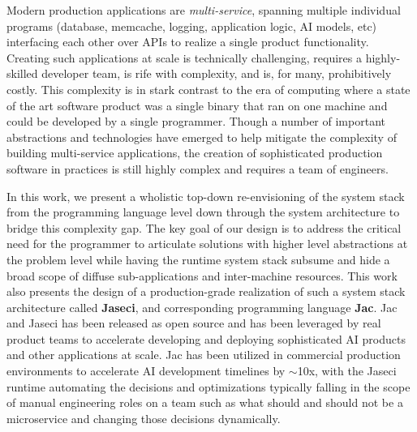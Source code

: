 Modern production applications are \emph{multi-service}, spanning multiple individual programs (database, memcache, logging, application logic, AI models, etc) interfacing each other over APIs to realize a single product functionality.
Creating such applications at scale is technically challenging, requires a highly-skilled developer team, is rife with complexity, and is, for many, prohibitively costly.
This complexity is in stark contrast to the era of computing where a state of the art software product was a single binary that ran on one machine and could be developed by a single programmer.
Though a number of important abstractions and technologies have emerged to help mitigate the complexity of building multi-service applications, the creation of sophisticated production software in practices is still highly complex and requires a team of engineers.


In this work, we present a wholistic top-down re-envisioning of the system stack from the programming language level down through the system architecture to bridge this complexity gap.
The key goal of our design is to address the critical need for the programmer to articulate solutions with higher level abstractions at the problem level while having the runtime system stack subsume and hide a broad scope of diffuse sub-applications and inter-machine resources.
This work also presents the design of a production-grade realization of such a system stack architecture called \textbf{Jaseci}, and corresponding programming language \textbf{Jac}.
Jac and Jaseci has been released as open source and has been leveraged by real product teams to accelerate developing and deploying sophisticated AI products and other applications at scale.
Jac has been utilized in commercial production environments to accelerate AI development timelines by  $\sim$10x, with the Jaseci runtime automating the decisions and optimizations typically falling in the scope of manual engineering roles on a team such as what should and should not be a microservice and changing those decisions dynamically.
